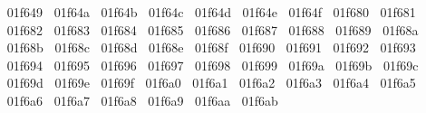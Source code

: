 {  ^^^^^^01f649%
  ^^^^^^01f64a%
  ^^^^^^01f64b%
  ^^^^^^01f64c%
  ^^^^^^01f64d%
  ^^^^^^01f64e%
  ^^^^^^01f64f%
  ^^^^^^01f680%
  ^^^^^^01f681%
  ^^^^^^01f682%
  ^^^^^^01f683%
  ^^^^^^01f684%
  ^^^^^^01f685%
  ^^^^^^01f686%
  ^^^^^^01f687%
  ^^^^^^01f688%
  ^^^^^^01f689%
  ^^^^^^01f68a%
  ^^^^^^01f68b%
  ^^^^^^01f68c%
  ^^^^^^01f68d%
  ^^^^^^01f68e%
  ^^^^^^01f68f%
  ^^^^^^01f690%
  ^^^^^^01f691%
  ^^^^^^01f692%
  ^^^^^^01f693%
  ^^^^^^01f694%
  ^^^^^^01f695%
  ^^^^^^01f696%
  ^^^^^^01f697%
  ^^^^^^01f698%
  ^^^^^^01f699%
  ^^^^^^01f69a%
  ^^^^^^01f69b%
  ^^^^^^01f69c%
  ^^^^^^01f69d%
  ^^^^^^01f69e%
  ^^^^^^01f69f%
  ^^^^^^01f6a0%
  ^^^^^^01f6a1%
  ^^^^^^01f6a2%
  ^^^^^^01f6a3%
  ^^^^^^01f6a4%
  ^^^^^^01f6a5%
  ^^^^^^01f6a6%
  ^^^^^^01f6a7%
  ^^^^^^01f6a8%
  ^^^^^^01f6a9%
  ^^^^^^01f6aa%
  ^^^^^^01f6ab%
}
